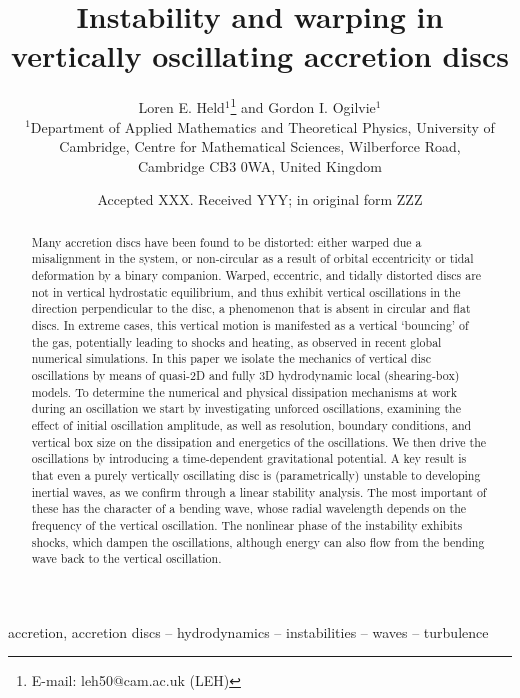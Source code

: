 \documentclass[fleqn,usenatbib]{mnras}
\title[Warping in vertically oscillating discs]{Instability and warping in vertically oscillating accretion discs}
\author[L. E. Held and G. I. Ogilvie]{
Loren E. Held$^{1}$\thanks{E-mail: leh50@cam.ac.uk (LEH)} and Gordon I. Ogilvie$^{1}$
\\
$^{1}$Department of Applied Mathematics and Theoretical Physics, University of Cambridge, Centre for Mathematical Sciences, Wilberforce Road,\\ 
Cambridge CB3 0WA, United Kingdom\\}
\date{Accepted XXX. Received YYY; in original form ZZZ}
\begin{document}
\label{firstpage}
\pagerange{\pageref{firstpage}--\pageref{lastpage}}
\maketitle

\begin{abstract}
Many accretion discs have been found to be distorted: either warped due a misalignment in the system, or non-circular as a result of orbital eccentricity or tidal deformation by a binary companion. Warped, eccentric, and tidally distorted discs are not in vertical hydrostatic equilibrium, and thus exhibit vertical oscillations in the direction perpendicular to the disc, a phenomenon that is absent in circular and flat discs. In extreme cases, this vertical motion is manifested as a vertical `bouncing' of the gas, potentially leading to shocks and heating, as observed in recent global numerical simulations. In this paper we isolate the mechanics of vertical disc oscillations by means of quasi-2D and fully 3D hydrodynamic local (shearing-box) models. To determine the numerical and physical dissipation mechanisms at work during an oscillation we start by investigating unforced oscillations, examining the effect of initial oscillation amplitude, as well as resolution, boundary conditions, and vertical box size on the dissipation and energetics of the oscillations. We then drive the oscillations by introducing a time-dependent gravitational potential. A key result is that even a purely vertically oscillating disc is (parametrically) unstable to developing inertial waves, as we confirm through a linear stability analysis. The most important of these has the character of a bending wave, whose radial wavelength depends on the frequency of the vertical oscillation. The nonlinear phase of the instability exhibits shocks, which dampen the oscillations, although energy can also flow from the bending wave back to the vertical oscillation.
\end{abstract}


\begin{keywords}
accretion, accretion discs -- hydrodynamics -- instabilities -- waves -- turbulence
\end{keywords}


\end{document}
